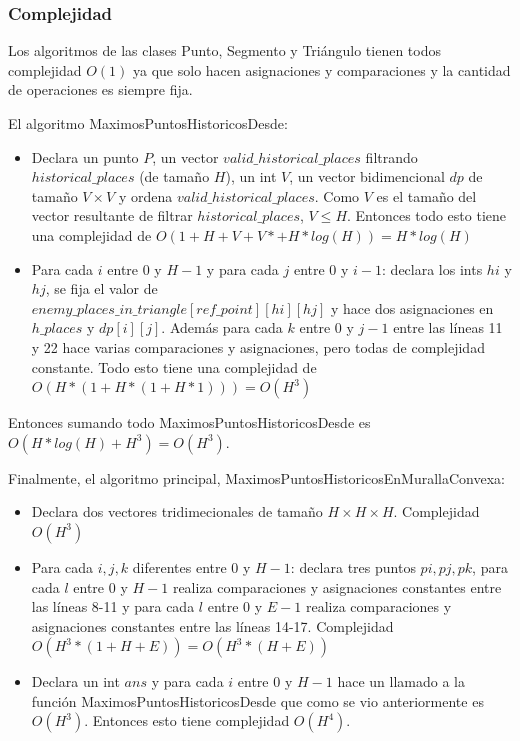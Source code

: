 \subsubsection{Complejidad}

Los algoritmos de las clases Punto, Segmento y Triángulo tienen todos complejidad $O(1)$ ya que solo hacen asignaciones y
comparaciones y la cantidad de operaciones es siempre fija.

El algoritmo MaximosPuntosHistoricosDesde:

\begin{itemize}
\item Declara un punto $P$, un vector $valid\_historical\_places$ filtrando $historical\_places$ (de tamaño $H$),
un int $V$, un vector bidimencional $dp$ de tamaño $V \times V$ y ordena $valid\_historical\_places$. Como $V$ es el tamaño
del vector resultante de filtrar $historical\_places$, $V \leq H$.
Entonces todo esto tiene una complejidad de $O(1+H+V+V*+H*log(H)) = H*log(H)$
\item Para cada $i$ entre 0 y $H-1$ y para cada $j$ entre 0 y $i-1$: declara los ints $hi$ y $hj$, se fija el valor de \\
$enemy\_places\_in\_triangle[ref\_point][hi][hj]$ y hace dos asignaciones en $h\_places$ y $dp[i][j]$. Además para cada
$k$ entre 0 y $j-1$ entre las líneas 11 y 22 hace varias comparaciones y asignaciones, pero todas de complejidad constante.
Todo esto tiene una complejidad de $O(H*(1+H*(1+H*1))) = O(H^3)$
\end{itemize}

Entonces sumando todo MaximosPuntosHistoricosDesde es $O(H*log(H)+H^3) = O(H^3)$.

Finalmente, el algoritmo principal, MaximosPuntosHistoricosEnMurallaConvexa:

\begin{itemize}
\item Declara dos vectores tridimecionales de tamaño $H \times H \times H$. Complejidad $O(H^3)$
\item Para cada $i,j,k$ diferentes entre 0 y $H-1$: declara tres puntos $pi,pj,pk$, para cada $l$ entre 0 y $H-1$
realiza comparaciones y asignaciones constantes entre las líneas 8-11 y para cada $l$ entre 0 y $E-1$
realiza comparaciones y asignaciones constantes entre las líneas 14-17. Complejidad $O(H^3*(1+H+E)) = O(H^3*(H+E))$
\item Declara un int $ans$ y para cada $i$ entre 0 y $H-1$ hace un llamado a la función MaximosPuntosHistoricosDesde que como
se vio anteriormente es $O(H^3)$. Entonces esto tiene complejidad $O(H^4)$.
\end{itemize}

